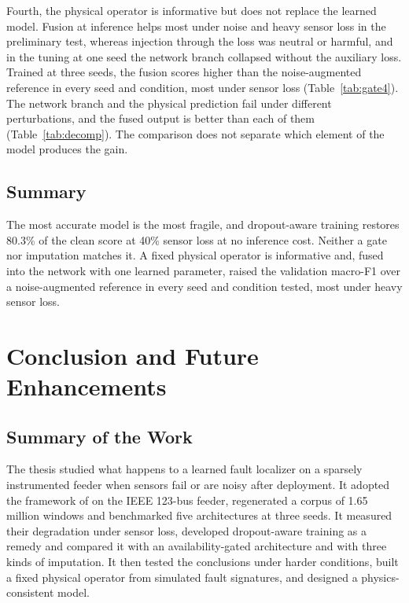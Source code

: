 \documentclass[MTech]{ugthesis}
\begin{document}
Fourth, the physical operator is informative but does not replace the learned model. Fusion at inference helps most under noise and heavy sensor loss in the preliminary test, whereas injection through the loss was neutral or harmful, and in the tuning at one seed the network branch collapsed without the auxiliary loss. Trained at three seeds, the fusion scores higher than the noise-augmented reference in every seed and condition, most under sensor loss (Table~\ref{tab:gate4}). The network branch and the physical prediction fail under different perturbations, and the fused output is better than each of them (Table~\ref{tab:decomp}). The comparison does not separate which element of the model produces the gain.

\section{Summary}

The most accurate model is the most fragile, and dropout-aware training restores 80.3\% of the clean score at 40\% sensor loss at no inference cost. Neither a gate nor imputation matches it. A fixed physical operator is informative and, fused into the network with one learned parameter, raised the validation macro-F1 over a noise-augmented reference in every seed and condition tested, most under heavy sensor loss.

\chapter{Conclusion and Future Enhancements}
\label{chap:conclusion}

\section{Summary of the Work}

The thesis studied what happens to a learned fault localizer on a sparsely instrumented feeder when sensors fail or are noisy after deployment. It adopted the framework of \citet{karabulut2026} on the IEEE 123-bus feeder, regenerated a corpus of 1.65 million windows and benchmarked five architectures at three seeds. It measured their degradation under sensor loss, developed dropout-aware training as a remedy and compared it with an availability-gated architecture and with three kinds of imputation. It then tested the conclusions under harder conditions, built a fixed physical operator from simulated fault signatures, and designed a physics-consistent model.
\end{document}
